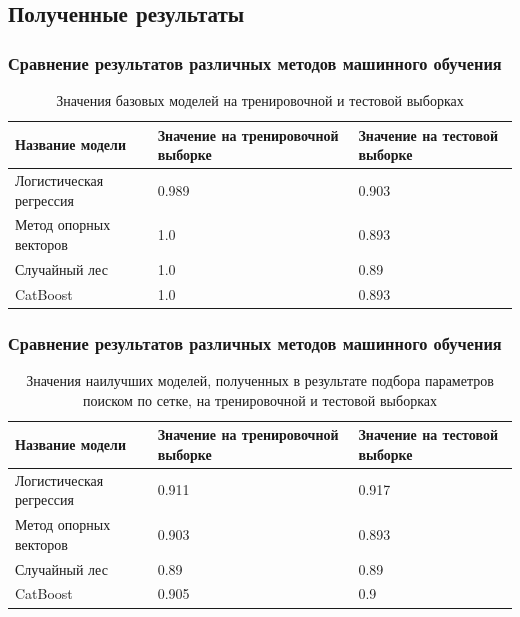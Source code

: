 \documentclass{beamer}
\begin{document}
		\subsection{Полученные результаты}
		\begin{frame}
			\frametitle{Сравнение результатов различных методов машинного обучения}
			\begin{center}
				\begin{table}[!htbp]
					\centering
					\small
					\begin{tabularx}{\linewidth}{|X|X|X|}
						\hline
						Название модели & Значение на тренировочной выборке & Значение на тестовой выборке\\ \hline
						Логистическая регрессия & 0.989 & 0.903 \\
						\hline 
						Метод опорных векторов & 1.0 & 0.893 \\
						\hline
						Случайный лес & 1.0 & 0.89 \\
						\hline
						CatBoost & 1.0 & 0.893 \\ 
						\hline
					\end{tabularx}
					\caption{Значения базовых моделей на тренировочной и тестовой выборках}	
					\label{tabl:baselines}
				\end{table}
			\end{center}
		\end{frame}
		\begin{frame}
			\frametitle{Сравнение результатов различных методов машинного обучения}
			\begin{center}
				\begin{table}[!htbp]
					\centering
					\small
					\begin{tabularx}{\linewidth}{|X|X|X|}
						\hline
						Название модели & Значение на тренировочной выборке & Значение на тестовой выборке\\ \hline
						Логистическая регрессия & 0.911 & 0.917 \\
						\hline 
						Метод опорных векторов & 0.903 & 0.893 \\
						\hline
						Случайный лес & 0.89 & 0.89 \\
						\hline
						CatBoost & 0.905 & 0.9 \\ 
						\hline
					\end{tabularx}
					\caption{Значения наилучших моделей, полученных в результате подбора параметров поиском по сетке, на тренировочной и тестовой выборках}	
					\label{tabl:gridsearch}
				\end{table}
			\end{center}
		\end{frame}
\end{document}
